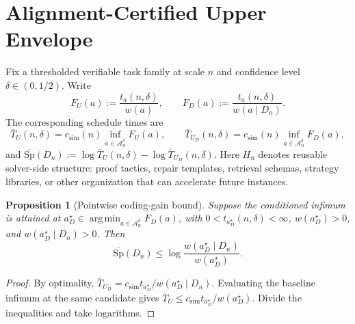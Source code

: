 \documentclass[10pt]{article}
\DeclareMathOperator*{\argmin}{arg\,min}
\theoremstyle{paperplain}
\newtheorem{proposition}[theorem]{Proposition}
\theoremstyle{paperdefinition}
\theoremstyle{paperremark}
\newcommand{\cA}{\mathcal{A}}
\newcommand{\Sp}{\mathrm{Sp}}
\begin{document}
\appendix

\section{Alignment-Certified Upper Envelope}
\label{app:upper-envelope}

Fix a thresholded verifiable task family at scale $n$ and confidence level $\delta\in(0,1/2)$. Write
\[
F_U(a):=\frac{t_a(n,\delta)}{w(a)},\qquad
F_D(a):=\frac{t_a(n,\delta)}{w(a\mid D_n)}.
\]
The corresponding schedule times are
\[
\overline T_U(n,\delta)=c_{\mathrm{sim}}(n)\inf_{a\in\cA_n^\delta}F_U(a),
\qquad
\overline T_{U_D}(n,\delta)=c_{\mathrm{sim}}(n)\inf_{a\in\cA_n^\delta}F_D(a),
\]
and $\overline{\Sp}(D_n):=\log \overline T_U(n,\delta)-\log \overline T_{U_D}(n,\delta)$.
Here $H_n$ denotes reusable solver-side structure: proof tactics, repair templates, retrieval schemas, strategy libraries, or other organization that can accelerate future instances.

\begin{proposition}[Pointwise coding-gain bound]
\label{prop:coding-gain}
Suppose the conditioned infimum is attained at
$a_D^\star\in\argmin_{a\in\cA_n^\delta}F_D(a)$, with $0<t_{a_D^\star}(n,\delta)<\infty$, $w(a_D^\star)>0$, and $w(a_D^\star\mid D_n)>0$. Then
\[
\overline{\Sp}(D_n)
\le
\log\frac{w(a_D^\star\mid D_n)}{w(a_D^\star)}.
\]
\end{proposition}

\begin{proof}
By optimality,
$\overline T_{U_D}=c_{\mathrm{sim}}t_{a_D^\star}/w(a_D^\star\mid D_n)$.
Evaluating the baseline infimum at the same candidate gives
$\overline T_U\le c_{\mathrm{sim}}t_{a_D^\star}/w(a_D^\star)$.
Divide the inequalities and take logarithms.
\end{proof}
\end{document}
